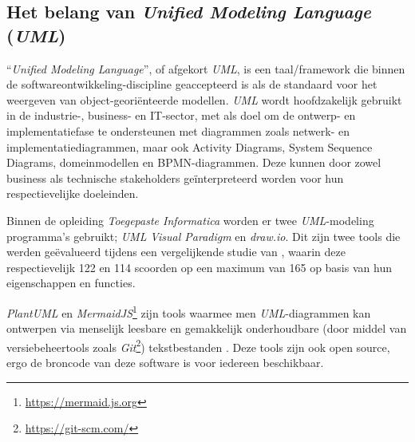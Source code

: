 



\subsection{Het belang van \emph{Unified Modeling Language} (\emph{UML})}%
\label{subsec:voorstel_belang_uml}%

``\emph{Unified Modeling Language}'', of afgekort \emph{UML}, is een taal/framework die binnen de softwareontwikkeling-discipline geaccepteerd is als de standaard voor het weergeven van object-georiënteerde modellen. \emph{UML} wordt hoofdzakelijk gebruikt in de industrie-, business- en IT-sector, met als doel om de ontwerp- en implementatiefase te ondersteunen met diagrammen zoals netwerk- en implementatiediagrammen, maar ook Activity Diagrams, System Sequence Diagrams, domeinmodellen en BPMN-diagrammen. Deze kunnen door zowel business als technische stakeholders geïnterpreteerd worden voor hun respectievelijke doeleinden. \autocite{Koc2021}

Binnen de opleiding \emph{Toegepaste Informatica} worden er twee \emph{UML}-modeling programma's gebruikt; \emph{UML} \emph{Visual Paradigm} en \emph{draw.io}. Dit zijn twee tools die werden geëvalueerd tijdens een vergelijkende studie van \textcite{Lu2023}, waarin deze respectievelijk 122 en 114 scoorden op een maximum van 165 op basis van hun eigenschappen en functies.

\emph{PlantUML} en \emph{MermaidJS}\footnote{\url{https://mermaid.js.org}} zijn tools waarmee men \emph{UML}-diagrammen kan ontwerpen via menselijk leesbare en gemakkelijk onderhoudbare (door middel van versiebeheertools zoals \emph{Git}\footnote{\url{https://git-scm.com/}}) tekstbestanden \autocite{Romeo2025}.
Deze tools zijn ook open source, ergo de broncode van deze software is voor iedereen beschikbaar.

